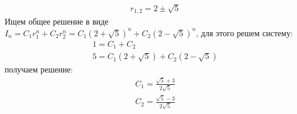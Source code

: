 \documentclass[a4paper,12pt]{article}
\begin{document}
\begin{Solution}
\[\begin{split}
		& r_{1,2} = 2 \pm \sqrt{5}
	\end{split}
\]
Ищем общее решение в виде $I_n = C_1 r_1^n + C_2 r_2^n = C_1 {\left(2 + \sqrt{5}\right)}^n + C_2 {\left(2 - \sqrt{5}\right)}^n$, для этого решем систему:
\[
	\begin{split}
		& 1 = C_1 + C_2 \\
		& 5 = C_1 \left(2 + \sqrt{5}\right) + C_2 \left(2 - \sqrt{5}\right)
	\end{split}
\]
получаем решение:
\[
	\begin{split}
		& C_1 = \frac{\sqrt{5} + 3}{2\sqrt{5}} \\
		& C_2 = \frac{\sqrt{5} - 3}{2\sqrt{5}}
	\end{split}
\]
\end{Solution}
\end{document}
